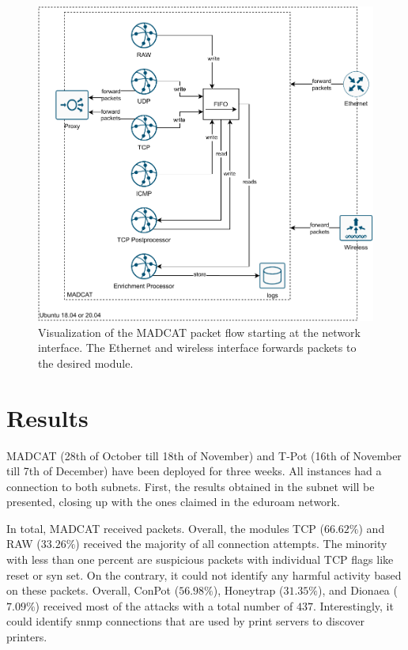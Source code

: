 \begin{figure}
    \centering
    \includegraphics[width=\textwidth]{figures/heicat-architecture.pdf}
    \caption[Visualization of the MADCAT packet flow]{
        Visualization of the MADCAT packet flow starting at the network interface.
        The Ethernet and wireless interface forwards packets to the desired module.
    }
    \label{fig:madcat-architecture}
\end{figure}

\section{Results}

MADCAT (28th of October till 18th of November) and T-Pot (16th of November till 7th of December) have been deployed for three weeks.
All instances had a connection to both subnets.
First, the results obtained in the subnet  will be presented, closing up with the ones claimed in the eduroam network.

In total, MADCAT received  packets.
Overall, the modules TCP ($66.62\%$) and RAW ($33.26\%$) received the majority of all connection attempts.
The minority with less than one percent are suspicious packets with individual TCP flags like reset or syn set. 
On the contrary, it could not identify any harmful activity based on these packets.
Overall, ConPot ($56.98\%$), Honeytrap ($31.35\%$), and Dionaea ($7.09\%$) received most of the attacks with a total number of $437$.
Interestingly, it could identify \ac{snmp} connections that are used by print servers to discover printers.

